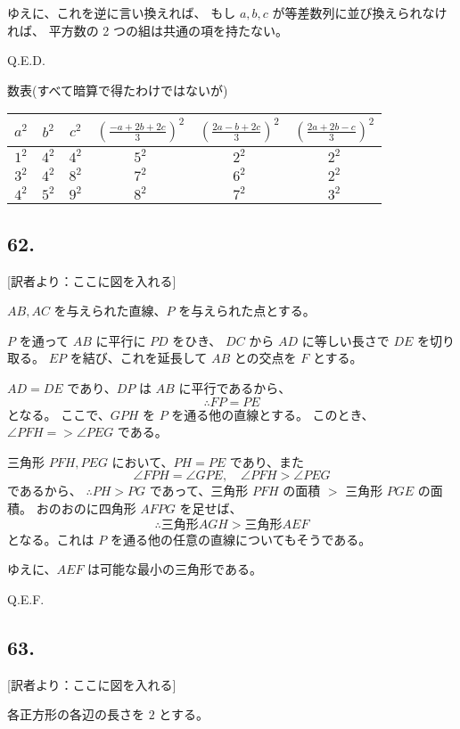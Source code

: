 ゆえに、これを逆に言い換えれば、
もし $a, b, c$ が等差数列に並び換えられなければ、
平方数の 2 つの組は共通の項を持たない。

Q.E.D.

\begin{center}
数表(すべて暗算で得たわけではないが)
\begin{tabular}{|c|c|c|c|c|c|}
\hline
$a^2$ & $b^2$ & $c^2$
 & $\left(\frac{-a+2b+2c}{3} \right)^2$
 & $\left(\frac{2a-b+2c}{3} \right)^2$
 & $\left(\frac{2a+2b-c}{3} \right)^2$\\
\hline
$1^2$ & $4^2$ & $4^2$ & $5^2$ & $2^2$ & $2^2$\\
$3^2$ & $4^2$ & $8^2$ & $7^2$ & $6^2$ & $2^2$\\
$4^2$ & $5^2$ & $9^2$ & $8^2$ & $7^2$ & $3^2$\\
\hline
\end{tabular}
\end{center}


\subsection*{62.}

[訳者より：ここに図を入れる] 

$AB, AC$ を与えられた直線、$P$ を与えられた点とする。

$P$ を通って $AB$ に平行に $PD$ をひき、
$DC$ から $AD$ に等しい長さで $DE$ を切り取る。
$EP$ を結び、これを延長して $AB$ との交点を $F$ とする。

$AD = DE$ であり、$DP$ は $AB$ に平行であるから、
\[
\therefore
FP = PE
\]
となる。
ここで、$GPH$ を $P$ を通る他の直線とする。
このとき、$\angle PFH = > \angle PEG$ である。

三角形 $PFH, PEG$ において、$PH = PE$ であり、また
\[
\angle FPH = \angle GPE,
\quad
\angle PFH > \angle PEG
\]
であるから、
$\therefore PH > PG$ であって、三角形 $PFH$ の面積 $>$ 三角形 $PGE$ の面積。
おのおのに四角形 $AFPG$ を足せば、
\[
\therefore
\mbox{三角形} AGH > \mbox{三角形} AEF
\]
となる。これは $P$ を通る他の任意の直線についてもそうである。

ゆえに、$AEF$ は可能な最小の三角形である。

Q.E.F.

\subsection*{63.}

[訳者より：ここに図を入れる] 

各正方形の各辺の長さを $2$ とする。

